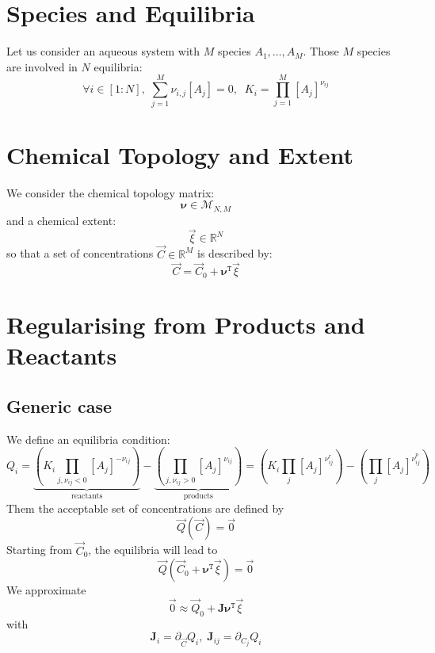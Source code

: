 \documentclass[aps,12pt]{revtex4}
\newcommand{\trn}[1]{{#1}^{\mathtt{T}}}
\newcommand{\conc}[1]{{\left[#1\right]}}
\begin{document}
\section{Species and Equilibria}
Let us consider an aqueous system with $M$ species $A_1,\ldots,A_M$.
Those $M$ species are involved in $N$ equilibria:
\begin{equation}
	\forall i\in[1:N], \; \sum_{j=1}^M \nu_{i,j} \conc{A_j} = 0,
	 \;\; K_i = \prod_{j=1}^M \conc{A_j}^{\nu_{ij}}
\end{equation}

\section{Chemical Topology and Extent}
We consider the chemical topology matrix:
\begin{equation}
	\bm{\nu} \in \mathcal{M}_{N,M}
\end{equation}
and a chemical extent:
\begin{equation}
	\vec{\xi} \in \mathbb{R}^{N}
\end{equation}
so that a set of concentrations $\vec{C}\in\mathbb{R}^M$ is described by:
\begin{equation}
	\vec{C} = \vec{C}_0 + \trn{\bm{\nu}} \vec{\xi}
\end{equation}

\section{Regularising from Products and Reactants}

\subsection{Generic case}
We define an equilibria condition:
\begin{equation}
	Q_i =  \underbrace{\left(K_i \prod_{j,\nu_{ij}<0} \conc{A_j}^{-\nu_{ij}}\right)}_{\text{reactants}} 
	- \underbrace{\left( \prod_{j,\nu_{ij}>0} \conc{A_j}^{\nu_{ij}}\right)}_{\text{products}}
	= \left(K_i \prod_{j} \conc{A_j}^{\nu^r_{ij}}\right)
	- \left( \prod_{j} \conc{A_j}^{\nu^p_{ij}}\right)  
\end{equation}
Them the acceptable set of concentrations are defined by
\begin{equation}
	\vec{Q}(\vec{C}) = \vec{0}
\end{equation}
Starting from $\vec{C}_0$, the equilibria will lead to
\begin{equation}
	\vec{Q}(\vec{C}_0+\trn{\bm{\nu}} \vec{\xi}) = \vec{0}
\end{equation}
We approximate
\begin{equation}
	\vec{0} \approx \vec{Q}_0 + \bm{J} \trn{\bm{\nu}} \vec{\xi}
\end{equation}
with
\begin{equation}
	\bm{J}_i = \partial_{\vec{C}} Q_i,\; \bm{J}_{ij}= \partial_{C_j} Q_i
\end{equation}
\end{document}
